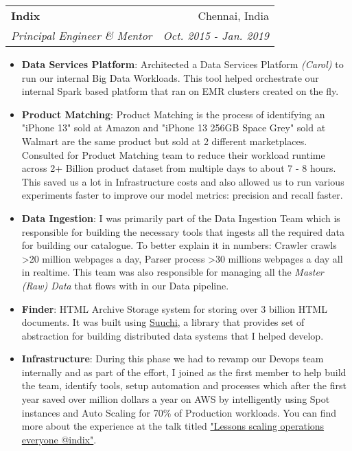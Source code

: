 \documentclass[letterpaper,11pt]{article}
\makeatletter
\newcommand{\resumeItem}[2]{
  \item\small{
    \textbf{#1}{: #2 \vspace{-2pt}}
  }
}
\newcommand{\resumeSubheading}[4]{
  \vspace{-1pt}\item
    \begin{tabular*}{0.97\textwidth}[t]{l@{\extracolsep{\fill}}r}
      \textbf{#1} & #2 \\
      \textit{\small#3} & \textit{\small #4} \\
    \end{tabular*}\vspace{-5pt}
}
\newcommand{\resumeItemListStart}{\begin{itemize}}
\newcommand{\resumeItemListEnd}{\end{itemize}\vspace{-5pt}}
\makeatother
\begin{document}
    \resumeSubheading
      {Indix}{Chennai, India}
      {Principal Engineer \& Mentor}{Oct. 2015 - Jan. 2019}
      \resumeItemListStart
        \resumeItem{Data Services Platform}
          {
            Architected a Data Services Platform \textit{(Carol)} to run our internal Big Data Workloads. This tool helped orchestrate our
            internal Spark based platform that ran on EMR clusters created on the fly.
          }
          \resumeItem{Product Matching}
          {
            Product Matching is the process of identifying an "iPhone 13" sold at Amazon and "iPhone 13 256GB Space Grey" sold at Walmart are the same product but sold at 2 different marketplaces. Consulted for Product Matching team to reduce their workload runtime across 2+ Billion product dataset from multiple days to about 7 - 8 hours. This saved us a lot in Infrastructure costs and also allowed us to run various experiments faster to improve our model metrics: precision and recall faster.
          }
          \resumeItem{Data Ingestion}
          {
            I was primarily part of the Data Ingestion Team which is responsible for building the necessary tools that ingests all the required data for building our catalogue. To better explain it in numbers: Crawler crawls >20 million webpages a day, Parser process >30 millions webpages a day all in realtime. This team was also responsible for managing all the \textit{Master (Raw) Data} that flows with in our Data pipeline.
          }
        \resumeItem{Finder}
          {
            HTML Archive Storage system for storing over 3 billion HTML documents. It was built using \href{https://github.com/ashwanthkumar/suuchi}{Suuchi}, a library that provides set of abstraction for building distributed data systems that I helped develop.
          }
          \resumeItem{Infrastructure}
          {
            During this phase we had to revamp our Devops team internally and as part of the effort, I joined as the first member to help build the team, identify tools, setup automation and processes which after the first year saved over million dollars a year on AWS by intelligently using Spot instances and Auto Scaling for 70\% of Production workloads.
            You can find more about the experience at the talk titled \href{https://speakerdeck.com/ashwanthkumar/lessons-scaling-operations-to-everyone-at-indix}{"Lessons scaling operations everyone @indix"}.
          }
      \resumeItemListEnd
\end{document}
